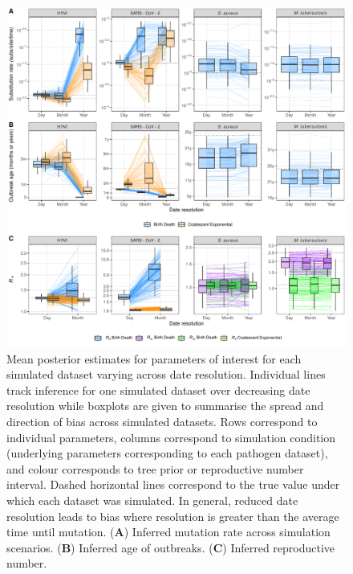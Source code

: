 \documentclass{article}
\begin{document}
\begin{spacing}{1.5}
\begin{figure}
    \centering
    \includegraphics[width=\textwidth]{simulation_parm_panel.pdf}
    \caption{Mean posterior estimates for parameters of interest for each simulated dataset varying across date resolution. Individual lines track inference for one simulated dataset over decreasing date resolution while boxplots are given to summarise the spread and direction of bias across simulated datasets. Rows correspond to individual parameters, columns correspond to simulation condition (underlying parameters corresponding to each pathogen dataset), and colour corresponds to tree prior or reproductive number interval. Dashed horizontal lines correspond to the true value under which each dataset was simulated. In general, reduced date resolution leads to bias where resolution is greater than the average time until mutation.  (\textbf{A}) Inferred mutation rate across simulation scenarios. (\textbf{B}) Inferred age of outbreaks. (\textbf{C}) Inferred reproductive number. }
    \label{fig:sim-parms}
\end{figure}


\end{spacing}
\end{document}
